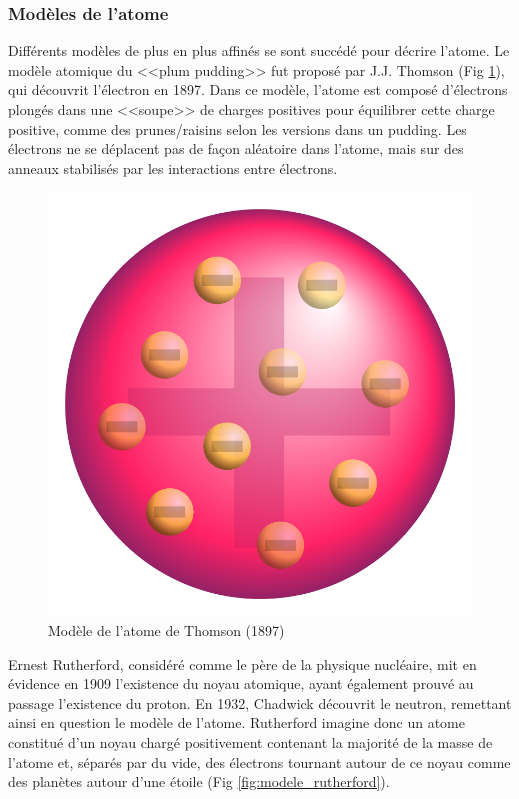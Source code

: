 \subsubsection{Modèles de l'atome}
Différents modèles de plus en plus affinés se sont succédé pour décrire l'atome. Le modèle atomique du <<plum pudding>> fut proposé par J.J. Thomson (Fig \ref{fig:modele_thompson}), qui découvrit l'électron en 1897. Dans ce modèle, l'atome est composé d'électrons plongés dans une <<soupe>> de charges positives pour équilibrer cette charge positive, comme des prunes/raisins selon les versions dans un pudding. Les électrons ne se déplacent pas de façon aléatoire dans l'atome, mais sur des anneaux stabilisés par les interactions entre électrons.

\begin{figure}[ht]
    \centering
    \includegraphics[scale=0.15]{Images1/thomson.png}
    \caption{Modèle de l'atome de Thomson (1897)}
    \label{fig:modele_thompson}
\end{figure}

Ernest Rutherford, considéré comme le père de la physique nucléaire, mit en évidence en 1909 l'existence du noyau atomique, ayant également prouvé au passage l'existence du proton. En 1932, Chadwick découvrit le neutron, remettant ainsi en question le modèle de l'atome. Rutherford imagine donc un atome constitué d'un noyau chargé positivement contenant la majorité de la masse de l'atome et, séparés par du vide, des électrons tournant autour de ce noyau comme des planètes autour d'une étoile (Fig \ref{fig:modele_rutherford}).

